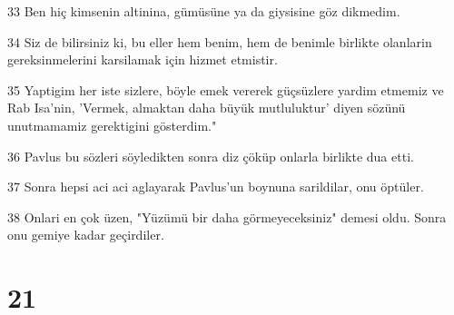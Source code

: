 \par 33 Ben hiç kimsenin altinina, gümüsüne ya da giysisine göz dikmedim.
\par 34 Siz de bilirsiniz ki, bu eller hem benim, hem de benimle birlikte olanlarin gereksinmelerini karsilamak için hizmet etmistir.
\par 35 Yaptigim her iste sizlere, böyle emek vererek güçsüzlere yardim etmemiz ve Rab Isa'nin, 'Vermek, almaktan daha büyük mutluluktur' diyen sözünü unutmamamiz gerektigini gösterdim."
\par 36 Pavlus bu sözleri söyledikten sonra diz çöküp onlarla birlikte dua etti.
\par 37 Sonra hepsi aci aci aglayarak Pavlus'un boynuna sarildilar, onu öptüler.
\par 38 Onlari en çok üzen, "Yüzümü bir daha görmeyeceksiniz" demesi oldu. Sonra onu gemiye kadar geçirdiler.

\chapter{21}

